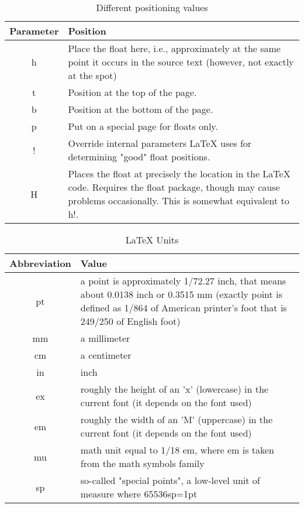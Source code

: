 \begin{table}[h!]
        \centering
        \begin{tabular}{|c|p{10cm}|}
            \hline
            \textbf{Parameter} & \textbf{Position} \\
            \hline
            h & Place the float here, i.e., approximately at the same point it occurs in the source text (however, not exactly at the spot)\\
            \hline
            t & Position at the top of the page.\\
            \hline
            b & Position at the bottom of the page.\\
            \hline
            p & Put on a special page for floats only.\\
            \hline
            ! & Override internal parameters LaTeX uses for determining "good" float positions.\\
            \hline
            H & Places the float at precisely the location in the LaTeX code. Requires the float package, though may cause problems occasionally. This is somewhat equivalent to h!. \\
            \hline
        \end{tabular}
        \caption{Different positioning values}
        \label{tab:Positioning}
\end{table}
\begin{table}[h!]
    \centering
    \begin{tabular}{|c|p{10cm}|}
        \hline
        \textbf{Abbreviation} & \textbf{Value} \\
        \hline
        pt & a point is approximately 1/72.27 inch, that means about 0.0138 inch or 0.3515 mm (exactly point is defined as 1/864 of American printer’s foot that is 249/250 of English foot) \\
        \hline
        mm & a millimeter \\
        \hline
        cm & a centimeter \\
        \hline
        in & inch \\
        \hline
        ex & roughly the height of an 'x' (lowercase) in the current font (it depends on the font used) \\
        \hline
        em & roughly the width of an 'M' (uppercase) in the current font (it depends on the font used) \\
        \hline
        mu & math unit equal to 1/18 em, where em is taken from the math symbols family \\
        \hline
        sp & so-called "special points", a low-level unit of measure where 65536sp=1pt \\
        \hline
    \end{tabular}
    \caption{\LaTeX{} Units}
    \label{tab:Units}
\end{table}


